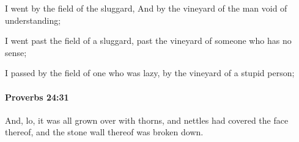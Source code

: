 			\begin{versebox}
					\item[BHS] 
					\item[ASV] I went by the field of the sluggard, And by the vineyard of the man void of understanding;
					\item[NIV] I went past the field of a sluggard, past the vineyard of someone who has no sense;
					\item[NRSV] I passed by the field of one who was lazy, by the vineyard of a stupid person;
			\end{versebox}

		\paragraph{Proverbs 24:31} %
			\label{PROVERBS-24-31}

			And, lo, it was all grown over with thorns, and nettles had covered the face thereof, and the stone wall thereof was broken down.

